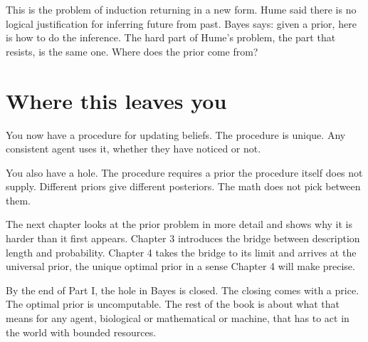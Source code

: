 This is the problem of induction returning in a new form. Hume said there is no logical justification for inferring future from past. Bayes says: given a prior, here is how to do the inference. The hard part of Hume's problem, the part that resists, is the same one. Where does the prior come from?

\section*{Where this leaves you}

You now have a procedure for updating beliefs. The procedure is unique. Any consistent agent uses it, whether they have noticed or not.

You also have a hole. The procedure requires a prior the procedure itself does not supply. Different priors give different posteriors. The math does not pick between them.

The next chapter looks at the prior problem in more detail and shows why it is harder than it first appears. Chapter 3 introduces the bridge between description length and probability. Chapter 4 takes the bridge to its limit and arrives at the universal prior, the unique optimal prior in a sense Chapter 4 will make precise.

By the end of Part I, the hole in Bayes is closed. The closing comes with a price. The optimal prior is uncomputable. The rest of the book is about what that means for any agent, biological or mathematical or machine, that has to act in the world with bounded resources.
